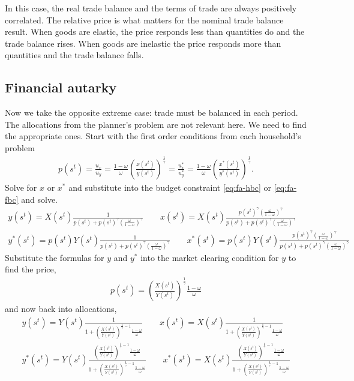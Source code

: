\documentclass[11pt,pdftex,twoside,letterpaper]{exam}
\begin{document}
In this case, the real trade balance and the terms of trade are always positively correlated. The relative price is what matters for the nominal trade balance result. When goods are elastic, the price responds less than quantities do and the trade balance rises. When goods are inelastic the price responds more than quantities and the trade balance falls.

\subsection{Financial autarky}

Now we take the opposite extreme case: trade must be balanced in each period. The allocations from the planner's problem are not relevant here. We need to find the appropriate ones. Start with the first order conditions from each household's problem
\begin{eqnarray}
  p(s^t) = \frac{u_x}{u_y} =\frac{1-\omega}{\omega}\left( \frac{x(s^t)}{y(s^t)}\right)^\frac{1}{\gamma}=\frac{u_{x}^*}{u_y^*} = \frac{1-\omega}{\omega}\left(\frac{x^*(s^t)}{y^*(s^t)}\right)^\frac{1}{\gamma}.
\end{eqnarray}
Solve for $x$ or $x^*$ and substitute into the budget constraint \eqref{eq:fa-hbc} or \eqref{eq:fa-fbc} and solve.
\begin{eqnarray}
  y(s^t) = X(s^t)\frac{1}{p(s^t)+p(s^t)^{\gamma}(\frac{\omega}{1-\omega})^\gamma} \qquad x(s^t) = X(s^t)\frac{p(s^t)^{\gamma}(\frac{\omega}{1-\omega})^\gamma}{p(s^t)+p(s^t)^{\gamma}(\frac{\omega}{1-\omega})^\gamma}\\
   y^*(s^t) = p(s^t)Y(s^t)\frac{1}{p(s^t)+p(s^t)^{\gamma}(\frac{\omega}{1-\omega})^\gamma} \qquad x^*(s^t) = p(s^t)Y(s^t)\frac{p(s^t)^{\gamma}(\frac{\omega}{1-\omega})^\gamma}{p(s^t)+p(s^t)^{\gamma}(\frac{\omega}{1-\omega})^\gamma}
\end{eqnarray}
Substitute the formulas for $y$ and $y^*$ into the market clearing condition for $y$ to find the price,
\begin{eqnarray}
  p(s^t)=\left(\frac{X(s^t)}{Y(s^t)}\right)^\frac{1}{\gamma}\frac{1-\omega}{\omega}
\end{eqnarray}
and now back into allocations,
\begin{eqnarray}
  y(s^t) = Y(s^t)\frac{1}{1+\left(\frac{X(s^t)}{Y(s^t)}\right)^{\frac{1}{\gamma}-1}\frac{1-\omega}{\omega}} \qquad x(s^t) = X(s^t)\frac{1}{1+\left(\frac{X(s^t)}{Y(s^t)}\right)^{\frac{1}{\gamma}-1}\frac{1-\omega}{\omega}}\\
   y^*(s^t) = Y(s^t)\frac{\left(\frac{X(s^t)}{Y(s^t)}\right)^{\frac{1}{\gamma}-1}\frac{1-\omega}{\omega}}{1+\left(\frac{X(s^t)}{Y(s^t)}\right)^{\frac{1}{\gamma}-1}\frac{1-\omega}{\omega}} \qquad x^*(s^t) = X(s^t)\frac{\left(\frac{X(s^t)}{Y(s^t)}\right)^{\frac{1}{\gamma}-1}\frac{1-\omega}{\omega}}{1+\left(\frac{X(s^t)}{Y(s^t)}\right)^{\frac{1}{\gamma}-1}\frac{1-\omega}{\omega}}
\end{eqnarray}
\end{document}
